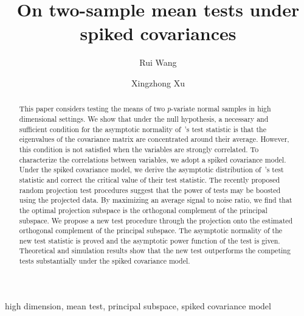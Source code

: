\documentclass[3p]{elsarticle}
\theoremstyle{plain}
\theoremstyle{definition}
\theoremstyle{remark}
\begin{document}
\begin{frontmatter}

\title{On two-sample mean tests under spiked covariances}

    \author[mymainaddress]{Rui Wang}
    \author[mymainaddress,mysecondaryaddress]{Xingzhong Xu}
    \address[mymainaddress]{School of Mathematics and Statistics, Beijing Institute of Technology, Beijing 
    100081,China}
    \address[mysecondaryaddress]{Beijing Key Laboratory on MCAACI, Beijing Institute of Technology, Beijing 100081,China}




\begin{abstract}
    This paper considers testing the means of two $p$-variate normal samples in high dimensional settings.
We show that under the null hypothesis, a necessary and sufficient condition for the asymptotic normality of~\cite{Chen2010A}'s test statistic is that the eigenvalues of the covariance matrix are concentrated around their average. However, this condition is not satisfied when the variables are strongly correlated.
    To characterize the correlations between variables, we adopt a spiked covariance model. 
    Under the spiked covariance model, we derive the asymptotic distribution of~\cite{Chen2010A}'s test statistic and correct the critical value of their test statistic.
    The recently proposed random projection test procedures suggest that the power of tests may be boosted using the projected data.
    By maximizing an average signal to noise ratio, we find that the optimal projection subspace is the orthogonal complement of the principal subspace. 
    We propose a new test procedure through the projection onto the estimated orthogonal complement of the principal subspace.
    The asymptotic normality of the new test statistic is proved and the asymptotic power function of the test is given.
    Theoretical and simulation results show that the new test outperforms the competing tests substantially under the spiked covariance model.
\end{abstract}

\begin{keyword}
    high dimension, mean test, principal subspace, spiked covariance model
\end{keyword}

\end{frontmatter}
\end{document}
